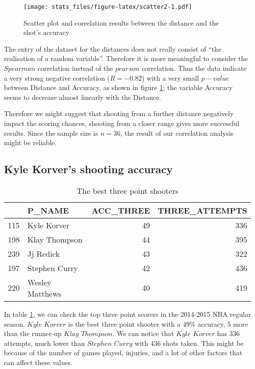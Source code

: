 \documentclass[
  12pt,
]{article}
\begin{document}
\begin{figure}
\centering
\texttt{[image: stats\_files/figure-latex/scatter2-1.pdf]}
\caption{\label{fig:scatter2}Scatter plot and correlation results between the distance and the shot's accuracy}
\end{figure}

The entry of the dataset for the distances does not really consist of ``the realisation of a random variable''. Therefore it is more meaningful to consider the \(Spearman\) correlation instead of the \(pearson\) correlation. Thus the data indicate a very strong negative correlation (\(R=-0.82\)) with a very small \(p-value\) between Distance and Accuracy, as shown in figure \ref{fig:scatter2}; the variable Accuracy seems to decrease almost linearly with the Distance.

Therefore we might suggest that shooting from a further distance negatively impact the scoring chances, shooting from a closer range gives more successful results. Since the sample size is \(n=36\), the result of our correlation analysis might be reliable.

\hypertarget{sec:Kyle}{%
\subsection{Kyle Korver's shooting accuracy}\label{sec:Kyle}}

\begin{table}

\caption{\label{tab:threepts-tab}The best three point shooters}
\centering
\begin{tabular}[t]{llrr}
\toprule
  & P\_NAME & ACC\_THREE & THREE\_ATTEMPTS\\
\midrule
115 & Kyle Korver & 49 & 336\\
198 & Klay Thompson & 44 & 395\\
239 & Jj Redick & 43 & 322\\
197 & Stephen Curry & 42 & 436\\
220 & Wesley Matthews & 40 & 419\\
\bottomrule
\end{tabular}
\end{table}

In table \ref{tab:threepts-tab}, we can check the top three point scorers in the 2014-2015 NBA regular season. \(Kyle\) \(Korver\) is the best three point shooter with a \(49\)\% accuracy, \(5\) more than the runner-up \(Klay\) \(Thompson\). We can notice that \(Kyle\) \(Korver\) has \(336\) attempts, much lower than \(Stephen\) \(Curry\) with \(436\) shots taken. This might be because of the number of games played, injuries, and a lot of other factors that can affect these values.
\end{document}
